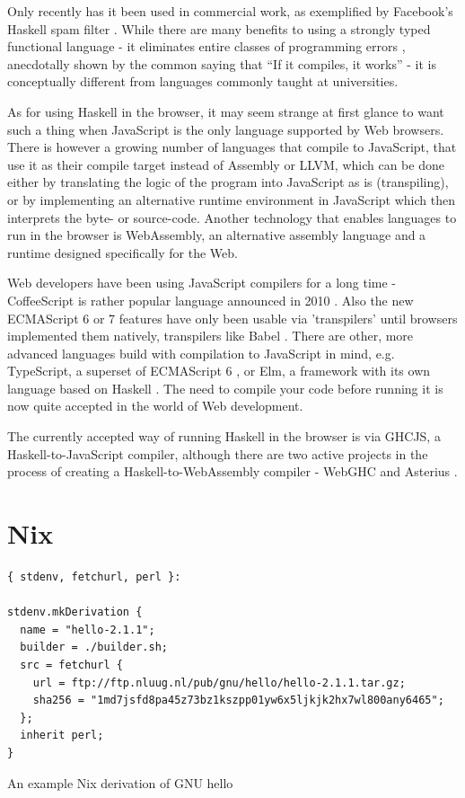 \documentclass[english,odsaz]{fitthesis}
\begin{document}
Only recently has it been used in commercial work, as exemplified by Facebook's
Haskell spam filter \cite{marlow2015fighting}. While there are many benefits to
using a strongly typed functional language - it eliminates entire classes of
programming errors \cite{Nanz_2015}, anecdotally shown by the common saying that
``If it compiles, it works'' - it is conceptually different from languages
commonly taught at universities.

As for using Haskell in the browser, it may seem strange at first glance to want
such a thing when JavaScript is the only language supported by Web
browsers. There is however a growing number of languages that compile to
JavaScript, that use it as their compile target instead of Assembly or LLVM,
which can be done either by translating the logic of the program into JavaScript
as is (transpiling), or by implementing an alternative runtime environment in
JavaScript which then interprets the byte- or source-code. Another technology
that enables languages to run in the browser is WebAssembly, an alternative
assembly language and a runtime designed specifically for the Web.

Web developers have been using JavaScript compilers for a long time -
CoffeeScript is rather popular language announced in 2010
\cite{coffeescript}. Also the new ECMAScript 6 or 7 features have only been usable
via 'transpilers' until browsers implemented them natively, transpilers like
Babel \cite{babel}. There are other, more advanced languages build with
compilation to JavaScript in mind, e.g. TypeScript, a superset of ECMAScript 6
\cite{typescript}, or Elm, a framework with its own language based on Haskell
\cite{czaplicki2012elm}. The need to compile your code before running it is now
quite accepted in the world of Web development.

The currently accepted way of running Haskell in the browser is via GHCJS, a
Haskell-to-JavaScript compiler, although there are two active projects in the
process of creating a Haskell-to-WebAssembly compiler - WebGHC \cite{webghc} and
Asterius \cite{asterius}.

\section{Nix}
\label{sec:orgb566476}
\begin{listing}[htbp]
\begin{verbatim}
{ stdenv, fetchurl, perl }:

stdenv.mkDerivation {
  name = "hello-2.1.1";
  builder = ./builder.sh;
  src = fetchurl {
    url = ftp://ftp.nluug.nl/pub/gnu/hello/hello-2.1.1.tar.gz;
    sha256 = "1md7jsfd8pa45z73bz1kszpp01yw6x5ljkjk2hx7wl800any6465";
  };
  inherit perl;
}
\end{verbatim}
\caption{An example Nix derivation of GNU hello}
\end{listing}
\end{document}
